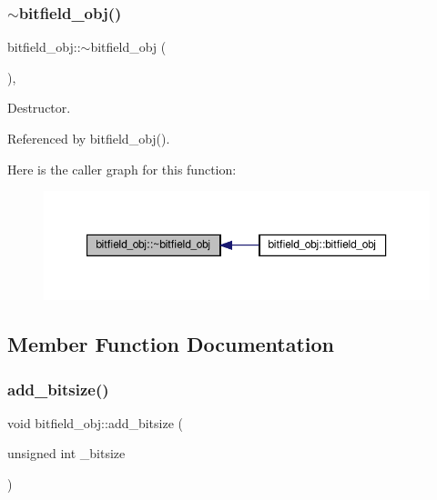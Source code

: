 \subsubsection{\texorpdfstring{$\sim$bitfield\+\_\+obj()}{~bitfield\_obj()}}
{\footnotesize\ttfamily bitfield\+\_\+obj\+::$\sim$bitfield\+\_\+obj (\begin{DoxyParamCaption}{ }\end{DoxyParamCaption})\hspace{0.3cm}{\ttfamily [override]}, {\ttfamily [default]}}



Destructor. 



Referenced by bitfield\+\_\+obj().

Here is the caller graph for this function\+:
\nopagebreak
\begin{figure}[H]
\begin{center}
\leavevmode
\includegraphics[width=350pt]{da/d41/classbitfield__obj_ae308c7cff55b47ec402a9e8d37bec04d_icgraph}
\end{center}
\end{figure}


\subsection{Member Function Documentation}
\mbox{\label{classbitfield__obj_a7788e2494e5c7e196f4853f10bad69a5}} 
\subsubsection{\texorpdfstring{add\+\_\+bitsize()}{add\_bitsize()}}
{\footnotesize\ttfamily void bitfield\+\_\+obj\+::add\+\_\+bitsize (\begin{DoxyParamCaption}\item[{unsigned int}]{\+\_\+bitsize }\end{DoxyParamCaption})\hspace{0.3cm}{\ttfamily [inline]}}



